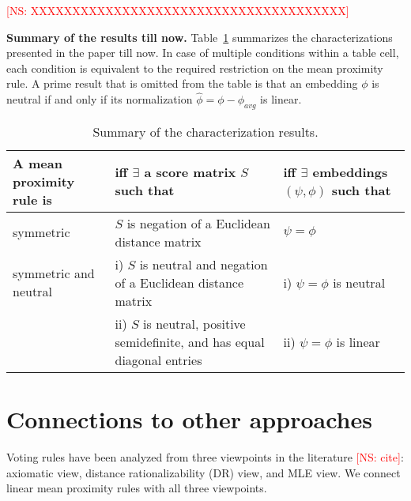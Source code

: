 \documentclass[prodmode,acmec]{ec-acmsmall}
\newcommand{\kibitz}[2]{\ifnum\Comments=1\textcolor{#1}{#2}\fi}
\newcommand{\ns}[1]{\kibitz{red} {[NS: #1]}}
\begin{document}



\ns{XXXXXXXXXXXXXXXXXXXXXXXXXXXXXXXXXXXXXX}

\noindent \textbf{Summary of the results till now.} Table~\ref{tab:summary} summarizes the characterizations presented in the paper till now. In case of multiple conditions within a table cell, each condition is equivalent to the required restriction on the mean proximity rule. A prime result that is omitted from the table is that an embedding $\phi$ is neutral if and only if its normalization $\hat{\phi} = \phi-\phi_{avg}$ is linear. 

\begin{table}[ht]
\centering
\begin{tabular}{ | p{3.5cm} | p{4cm} | p{3.5cm} | }
\hline
\rule{0pt}{3ex}\textbf{A mean proximity rule is} & \textbf{iff $\boldsymbol{\exists}$ a score matrix $S$ such that} & \textbf{iff $\exists$ embeddings $(\psi,\phi)$ such that} \\[0.1cm] 
\hline 
\rule{0pt}{3ex}symmetric & $S$ is negation of a Euclidean distance matrix & $\psi = \phi$ \\[0.1cm]
\hline
\rule{0pt}{3ex}\multirow{2}{*} {symmetric and neutral} & i) $S$ is neutral and negation of a Euclidean distance matrix & i) $\psi = \phi$ is neutral\\
& ii) $S$ is neutral, positive semidefinite, and has equal diagonal entries & ii) $\psi = \phi$ is linear \\[0.1cm]
\hline
\end{tabular}
\captionsetup{width=\textwidth}
\caption{Summary of the characterization results.}
\label{tab:summary}
\end{table}


\section{Connections to other approaches}

Voting rules have been analyzed from three viewpoints in the literature \ns{cite}: axiomatic view, distance rationalizability (DR) view, and MLE view. We connect linear mean proximity rules with all three viewpoints.
\end{document}
